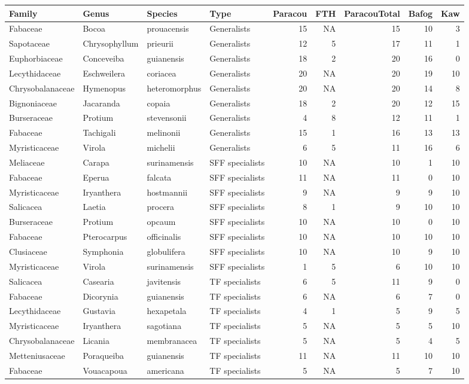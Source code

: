 \documentclass[
]{book}
\begin{document}
\begin{tabular}{l|l|l|l|r|r|r|r|r}
\hline
Family & Genus & Species & Type & Paracou & FTH & ParacouTotal & Bafog & Kaw\\
\hline
Fabaceae & Bocoa & prouacensis & Generalists & 15 & NA & 15 & 10 & 3\\
\hline
Sapotaceae & Chrysophyllum & prieurii & Generalists & 12 & 5 & 17 & 11 & 1\\
\hline
Euphorbiaceae & Conceveiba & guianensis & Generalists & 18 & 2 & 20 & 16 & 0\\
\hline
Lecythidaceae & Eschweilera & coriacea & Generalists & 20 & NA & 20 & 19 & 10\\
\hline
Chrysobalanaceae & Hymenopus & heteromorphus & Generalists & 20 & NA & 20 & 14 & 8\\
\hline
Bignoniaceae & Jacaranda & copaia & Generalists & 18 & 2 & 20 & 12 & 15\\
\hline
Burseraceae & Protium & stevensonii & Generalists & 4 & 8 & 12 & 11 & 1\\
\hline
Fabaceae & Tachigali & melinonii & Generalists & 15 & 1 & 16 & 13 & 13\\
\hline
Myristicaceae & Virola & michelii & Generalists & 6 & 5 & 11 & 16 & 6\\
\hline
Meliaceae & Carapa & surinamensis & SFF specialists & 10 & NA & 10 & 1 & 10\\
\hline
Fabaceae & Eperua & falcata & SFF specialists & 11 & NA & 11 & 0 & 10\\
\hline
Myristicaceae & Iryanthera & hostmannii & SFF specialists & 9 & NA & 9 & 9 & 10\\
\hline
Salicacea & Laetia & procera & SFF specialists & 8 & 1 & 9 & 10 & 10\\
\hline
Burseraceae & Protium & opcaum & SFF specialists & 10 & NA & 10 & 0 & 10\\
\hline
Fabaceae & Pterocarpus & officinalis & SFF specialists & 10 & NA & 10 & 10 & 10\\
\hline
Clusiaceae & Symphonia & globulifera & SFF specialists & 10 & NA & 10 & 9 & 10\\
\hline
Myristicaceae & Virola & surinamensis & SFF specialists & 1 & 5 & 6 & 10 & 10\\
\hline
Salicacea & Casearia & javitensis & TF specialists & 6 & 5 & 11 & 9 & 0\\
\hline
Fabaceae & Dicorynia & guianensis & TF specialists & 6 & NA & 6 & 7 & 0\\
\hline
Lecythidaceae & Gustavia & hexapetala & TF specialists & 4 & 1 & 5 & 9 & 5\\
\hline
Myristicaceae & Iryanthera & sagotiana & TF specialists & 5 & NA & 5 & 5 & 10\\
\hline
Chrysobalanaceae & Licania & membranacea & TF specialists & 5 & NA & 5 & 4 & 5\\
\hline
Metteniusaceae & Poraqueiba & guianensis & TF specialists & 11 & NA & 11 & 10 & 10\\
\hline
Fabaceae & Vouacapoua & americana & TF specialists & 5 & NA & 5 & 7 & 10\\
\hline
\end{tabular}
\end{document}

